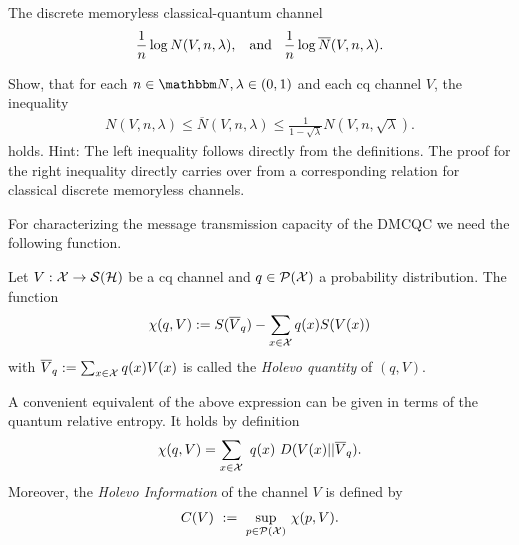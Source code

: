 \begin{section}{The discrete memoryless  classical-quantum channel}
	\begin{align*}
	\frac{1}{n}\log N(V,n,\lambda), \hspace{.3cm} \text{and} \hspace{.3cm} \frac{1}{n} \log \overline{N}(V,n,\lambda).
	\end{align*}
	\begin{exercise}
		Show, that for each $n\in \bbmN, \lambda \in (0,1)$ and each cq channel $V$, the inequality
		\begin{align*}
		N(V,n,\lambda) \leq \overline{N}(V,n,\lambda) \leq  \frac{1}{1-\sqrt{\lambda}} N(V,n,\sqrt{\lambda}) .
		\end{align*}
		holds. Hint: The left inequality follows directly from the definitions. The proof for the right inequality directly carries over from a corresponding relation for classical discrete memoryless channels.
	\end{exercise}
	For characterizing the message transmission capacity of the DMCQC we need the following function.
	\begin{definition}
		Let $V: {\mathcal X} \rightarrow {\mathcal S}({\mathcal H})$ be a cq channel and $q \in {\mathcal P}({\mathcal X})$ a probability distribution. The function
		\begin{align}
		\chi(q,V) := S(\overline{V}_q) - \sum_{x \in {\mathcal X}} q(x) S(V(x))
		\end{align}
		with $\overline{V}_q := \sum_{x \in {\mathcal X}} q(x) V(x)$ is called the \emph{Holevo quantity}  of $(q,V)$. 
	\end{definition}
	A convenient equivalent of the above expression can be given in terms of the quantum relative entropy. It holds by definition 
	\begin{align}
	\chi(q,V) = \sum_{x \in {\mathcal X}} \ q(x) \ D(V(x)||\overline{V}_q). \label{altern_holevo_chi_form}
	\end{align}
	Moreover, the \emph{Holevo Information}  of the channel $V$ is defined by
	\begin{align} \index{Holevo information}
	C(V) \ := \ \underset{p \in \cP(\cX)}{\sup} \ \chi(p,V).  \label{def:cq_holevo_information}

\end{align}
\end{section}

